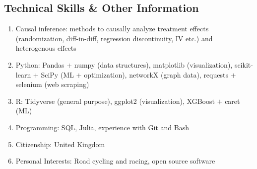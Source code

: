 \documentclass[letterpaper,11pt,oneside]{article}
\begin{document}
\subsection*{Technical Skills \& Other Information}
\begin{enumerate}[itemsep=0pt, label={\textbf{--}}, leftmargin=12pt]
    \item Causal inference: methods to causally analyze treatment effects
    (randomization, diff-in-diff, regression discontinuity, IV etc.) and heterogenous effects
    \item Python: Pandas $+$ numpy (data structures), matplotlib (visualization), scikit-learn $+$ SciPy (ML $+$ optimization), networkX (graph data), requests $+$ selenium (web scraping)
    \item R: Tidyverse (general purpose), ggplot2 (visualization), XGBoost $+$ caret (ML)
    \item Programming: SQL, Julia,  experience with Git and Bash
    \item Citizenship: United Kingdom %
    \item Personal Interests: Road cycling and racing, open source software
\end{enumerate}

\end{document}
